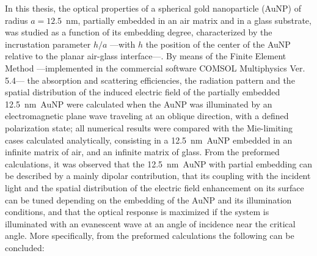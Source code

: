
In this thesis, the  optical properties of a spherical gold nanoparticle (AuNP) of radius $a = 12.5$~nm, partially embedded in an air matrix and in a glass substrate, was studied as a function of its embedding degree, characterized by the incrustation parameter $h/a$ ---with $h$ the position of the center of the AuNP relative to the planar air-glass interface---. By means of the Finite Element Method ---implemented in the commercial software COMSOL Multiphysics\texttrademark{} Ver. 5.4--- the absorption and scattering efficiencies, the radiation pattern and the spatial distribution of the induced electric field of the partially embedded 12.5~nm~AuNP were calculated when the AuNP was illuminated by an electromagnetic plane wave traveling at an oblique direction, with a defined polarization state; all numerical results were compared with the Mie-limiting cases calculated analytically, consisting in a 12.5~nm~AuNP embedded in an infinite matrix of air, and an infinite matrix of glass. From the preformed calculations, it was observed that the 12.5~nm~AuNP with partial embedding can be described by a mainly dipolar contribution, that its coupling with the incident light and the spatial distribution of the electric field enhancement on its surface can be tuned depending on the embedding of the AuNP and its illumination conditions, and that the optical response is maximized if the system is illuminated with an evanescent wave at an angle of incidence near the critical angle. More specifically, from the preformed  calculations the following can be concluded:

